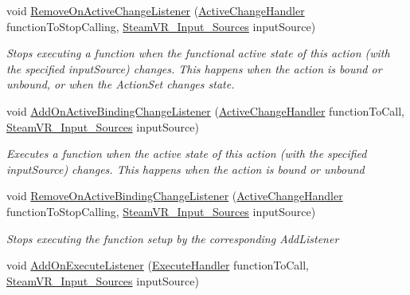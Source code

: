 \begin{DoxyCompactItemize}
void \mbox{\hyperlink{class_valve_1_1_v_r_1_1_steam_v_r___action___vibration_a60f0e8aeed560759d517a576ff56bfa7}{Remove\+On\+Active\+Change\+Listener}} (\mbox{\hyperlink{class_valve_1_1_v_r_1_1_steam_v_r___action___vibration_a7706b3c9b71de3bea16a3fab8a882f0b}{Active\+Change\+Handler}} function\+To\+Stop\+Calling, \mbox{\hyperlink{namespace_valve_1_1_v_r_a82e5bf501cc3aa155444ee3f0662853f}{Steam\+V\+R\+\_\+\+Input\+\_\+\+Sources}} input\+Source)
\begin{DoxyCompactList}\small\item\em Stops executing a function when the {\itshape functional} active state of this action (with the specified input\+Source) changes. This happens when the action is bound or unbound, or when the Action\+Set changes state. \end{DoxyCompactList}\item 
void \mbox{\hyperlink{class_valve_1_1_v_r_1_1_steam_v_r___action___vibration_accfc5869c3abe1a5f4911c182679aef3}{Add\+On\+Active\+Binding\+Change\+Listener}} (\mbox{\hyperlink{class_valve_1_1_v_r_1_1_steam_v_r___action___vibration_a7706b3c9b71de3bea16a3fab8a882f0b}{Active\+Change\+Handler}} function\+To\+Call, \mbox{\hyperlink{namespace_valve_1_1_v_r_a82e5bf501cc3aa155444ee3f0662853f}{Steam\+V\+R\+\_\+\+Input\+\_\+\+Sources}} input\+Source)
\begin{DoxyCompactList}\small\item\em Executes a function when the active state of this action (with the specified input\+Source) changes. This happens when the action is bound or unbound \end{DoxyCompactList}\item 
void \mbox{\hyperlink{class_valve_1_1_v_r_1_1_steam_v_r___action___vibration_a2f792bbebfd9c63d77a0c220bf2f22c0}{Remove\+On\+Active\+Binding\+Change\+Listener}} (\mbox{\hyperlink{class_valve_1_1_v_r_1_1_steam_v_r___action___vibration_a7706b3c9b71de3bea16a3fab8a882f0b}{Active\+Change\+Handler}} function\+To\+Stop\+Calling, \mbox{\hyperlink{namespace_valve_1_1_v_r_a82e5bf501cc3aa155444ee3f0662853f}{Steam\+V\+R\+\_\+\+Input\+\_\+\+Sources}} input\+Source)
\begin{DoxyCompactList}\small\item\em Stops executing the function setup by the corresponding Add\+Listener \end{DoxyCompactList}\item 
void \mbox{\hyperlink{class_valve_1_1_v_r_1_1_steam_v_r___action___vibration_a9500575c412d448cd6f142429627b995}{Add\+On\+Execute\+Listener}} (\mbox{\hyperlink{class_valve_1_1_v_r_1_1_steam_v_r___action___vibration_ac075e9e8f3e9eea89be32c403e6f86d5}{Execute\+Handler}} function\+To\+Call, \mbox{\hyperlink{namespace_valve_1_1_v_r_a82e5bf501cc3aa155444ee3f0662853f}{Steam\+V\+R\+\_\+\+Input\+\_\+\+Sources}} input\+Source)

\end{DoxyCompactItemize}
